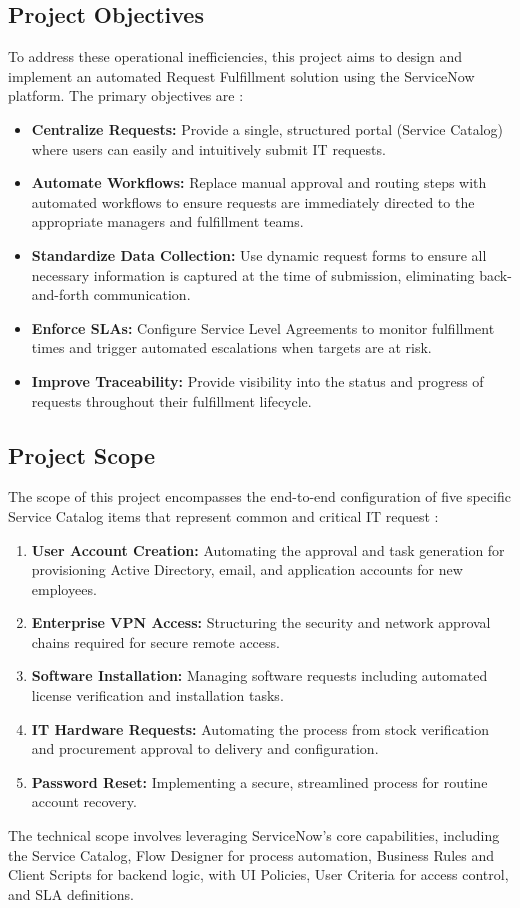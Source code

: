 \documentclass[12pt,a4paper]{report}
\begin{document}
\subsection{Project Objectives}
To address these operational inefficiencies, this project aims to design and implement an automated 
Request Fulfillment solution using the ServiceNow platform. The primary objectives are : 
\begin{itemize}
\item \textbf{Centralize Requests:} Provide a single, structured portal (Service Catalog) 
where users can easily and intuitively submit IT requests.
\item \textbf{Automate Workflows:} Replace manual approval and routing steps with automated 
workflows to ensure requests are immediately directed to 
the appropriate managers and fulfillment teams.
\item \textbf{Standardize Data Collection:} Use dynamic request forms to ensure all 
necessary information is captured at the time of submission, 
eliminating back-and-forth communication.
\item \textbf{Enforce SLAs:} Configure Service Level Agreements to monitor
fulfillment times and trigger automated escalations when targets are at risk.
\item \textbf{Improve Traceability:} Provide visibility into the status and
progress of requests throughout their fulfillment lifecycle.
\end{itemize}

\subsection{Project Scope}
The scope of this project encompasses the end-to-end configuration of five specific Service 
Catalog items that represent common and critical IT request : 
\begin{enumerate}
    \item \textbf{User Account Creation:} Automating the approval and task generation for 
    provisioning Active Directory, email, and application accounts for new employees.
    \item \textbf{Enterprise VPN Access:} Structuring the security and network 
    approval chains required for secure remote access.
    \item \textbf{Software Installation:} Managing software requests including automated 
    license verification and installation tasks.
    \item \textbf{IT Hardware Requests:} Automating the process from stock verification and 
    procurement approval to delivery and configuration.
    \item \textbf{Password Reset:} Implementing a secure, streamlined process for routine 
    account recovery.
\end{enumerate}
The technical scope involves leveraging ServiceNow's core capabilities, including the Service 
Catalog, Flow Designer for process automation, Business Rules and Client Scripts for backend 
logic, with UI Policies, User Criteria for access control, and SLA definitions.
\end{document}

